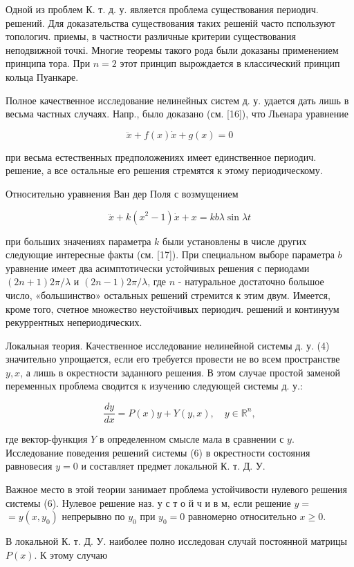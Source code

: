 \documentclass[10pt]{article}
\begin{document}
Одной из проблем К. т. д. у. является проблема существования периодич. решений. Для доказательства существования таких решеній часто пспользуют топологич. приемы, в частности различные критерии существования неподвижной точкі. Многие теоремы такого рода были доказаны применением принципа тора. При $n=2$ этот принцип вырождается в классический принцип кольца Пуанкаре.



Полное качественное исследование нелинейных систем д. у. удается дать лишь в весьма частных случаях. Напр., было доказано (см. [16]), что Льенара уравнение



\[

\ddot{x}+f(x) \dot{x}+g(x)=0

\]



при весьма естественных предположениях имеет единственное периодич. решение, а все остальные его решения стремятся к этому периодическому.



Относительно уравнения Ван дер Поля с возмущением



\[

\ddot{x}+k\left(x^{2}-1\right) \dot{x}+x=k b \lambda \sin \lambda t

\]



при больших значениях параметра $k$ были установлены в числе других следующие интересные факты (см. [17]). При специальном выборе параметра $b$ уравнение имеет два асимптотически устойчивых решения с периодами $(2 n+1) 2 \pi / \lambda$ и $(2 n-1) 2 \pi / \lambda$, где $n$ - натуральное достаточно большое число, «большинство» остальных решений стремится к этим двум. Имеется, кроме того, счетное множество неустойчивых периодич. решений и континуум рекуррентных непериодических.



Локальная теория. Качественное исследование нелинейной системы д. у. (4) значительно упрощается, если его требуется провести не во всем пространстве $y, x$, а лишь в окрестности заданного решения. В этом случае простой заменой переменных проблема сводится к изучению следующей системы д. у.:



\[

\frac{d y}{d x}=P(x) y+Y(y, x), \quad y \in \mathbb{R}^{n},

\]



где вектор-функция $Y$ в определенном смысле мала в сравнении с $y$. Исследование поведения решений системы (6) в окрестности состояния равновесия $y=0$ и составляет предмет локальной К. т. Д. У.



Важное место в этой теории занимает проблема устойчивости нулевого решения системы (6). Нулевое решение наз. у с т о й ч и в м, если решение $y=$ $=y\left(x, y_{0}\right)$ непрерывно по $y_{0}$ при $y_{0}=0$ равномерно относительно $x \geqslant 0$.



В локальной К. т. Д. У. наиболее полно исследован случай постоянной матрицы $P(x)$. $К$ этому случаю
\end{document}
